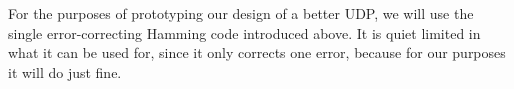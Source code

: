 \documentclass[conference]{IEEEtran}
\theoremstyle{definition}
\begin{document}
For the purposes of prototyping our design of a better
UDP, we will use the single error-correcting Hamming
code introduced above.  It is quiet limited in what it
can be used for, since it only corrects one error, because
for our purposes it will do just fine.




%
%



%
%
\end{document}
